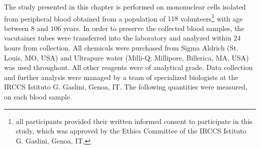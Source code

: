The study presented in this chapter is performed on mononuclear cells isolated from peripheral blood obtained from a population of $118$ volunteers\footnote{all participants provided their written informed consent to participate in this study, which was approved by the Ethics Committee of the IRCCS Istituto G. Gaslini, Genoa, IT, } with age between $8$ and $106$ years.
In order to preserve the collected blood samples, the vacutainer tubes were transferred into the laboratory and analyzed within $24$ hours from collection.
All chemicals were purchased from Sigma Aldrich (St. Louis, MO, USA) and Ultrapure water (Milli-Q; Millipore, Billerica, MA, USA) was used throughout. All other reagents were of analytical grade.
Data collection and further analysis were managed by a team of specialized biologists at the IRCCS Istituto G. Gaslini, Genoa, IT. The following quantities were measured, on each blood sample.

